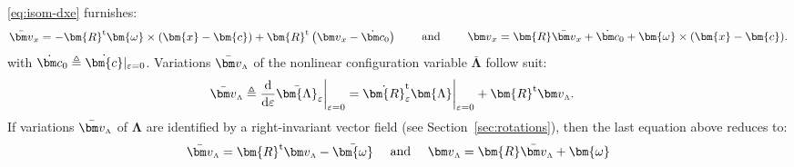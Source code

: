 \eqref{eq:isom-dxe} furnishes: %
\begin{equation*} 
\begin{aligned}
\bar{\VarConfig}_x &= -\bm{R}^{\mathrm{t}} \bm{\omega} \times \left(\bm{x}-\bm{c}\right)
+ \bm{R}^{\mathrm{t}}\left(\VarConfig_x - \VarRigidTran\right) \\
\end{aligned}
\qquad\text{ and }\qquad
\VarConfig_x = \bm{R}\bar{\VarConfig}_x + \VarRigidTran + \bm{\omega}\times (\bm{x}-\bm{c}).
\end{equation*}
with \(\VarRigidTran \triangleq \dot{\bm{c}}|_{\varepsilon=0}\). 
Variations \(\bar{\VarConfig}_{\scriptscriptstyle{\Lambda}}\) of the nonlinear configuration variable
\(\bar{\bm{\Lambda}}\) follow suit: %
\begin{equation*} 
\begin{aligned}
\bar{\VarConfig}_{\scriptscriptstyle{\Lambda}} &\triangleq \frac{\mathrm{d}}{\mathrm{d}\varepsilon}\bar{\bm{\Lambda}}_{\varepsilon}\biggr|_{\varepsilon=0} %
= \dot{\bm{R}}^{\mathrm{t}}_\varepsilon \bm{\Lambda} \biggr|_{\varepsilon=0} + \bm{R}^{\mathrm{t}} \VarConfig_{\scriptscriptstyle{\Lambda}} .%
\end{aligned}
\end{equation*}
If variations \(\bar{\VarConfig}_{\scriptscriptstyle{\Lambda}}\) of
\(\bm{\Lambda}\) are identified by a right-invariant vector field (see
Section~\ref{sec:rotations}), then the last equation above reduces to:
\begin{equation}
\begin{aligned}
\bar{\VarConfig}_{\scriptscriptstyle{\Lambda}} = \bm{R}^{\mathrm{t}}\VarConfig_{\scriptscriptstyle{\Lambda}} - \bar{\bm{\omega}}
\end{aligned}
\quad\text{ and }\quad
\begin{aligned}
\VarConfig_{\scriptscriptstyle{\Lambda}} &= \bm{R} \bar{\VarConfig}_{\scriptscriptstyle{\Lambda}} + \bm{\omega} \\
\end{aligned}
\label{eq:rottan}
\end{equation} 

